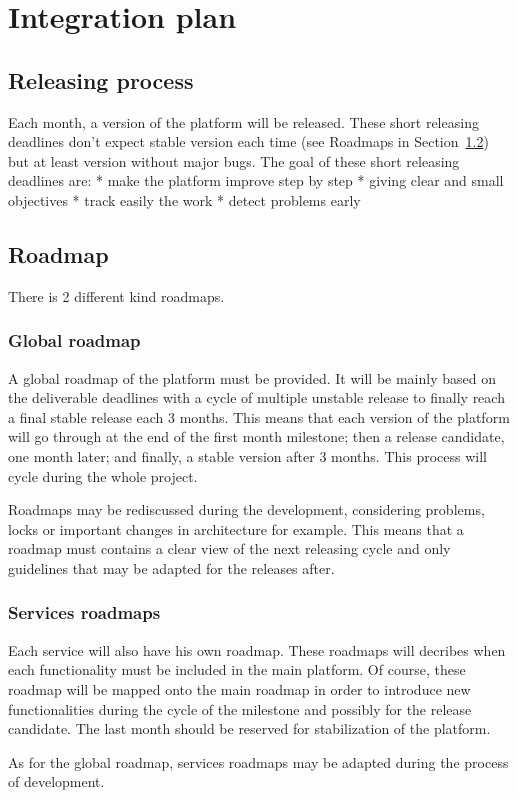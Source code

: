 \chapter{Integration plan}
\label{ch:integration-plan}

\section{Releasing process}
\label{sec:releasing-process}

Each month, a version of the platform will be released.
These short releasing deadlines don't expect stable version each time (see Roadmaps in Section~\ref{sec:roadmap}) but at least version without major bugs.
The goal of these short releasing deadlines are:
* make the platform improve step by step
* giving clear and small objectives
* track easily the work
* detect problems early

\section{Roadmap}
\label{sec:roadmap}

There is 2 different kind roadmaps.
\subsection{Global roadmap}
\label{sec:global-roadmap}

A global roadmap of the platform must be provided.
It will be mainly based on the deliverable deadlines with a cycle of multiple unstable release to finally reach a final stable release each 3 months.
This means that each version of the \learnpad platform will go through at the end of the first month milestone; then a release candidate, one month later; and finally, a stable version after 3 months.
This process will cycle during the whole project.

Roadmaps may be rediscussed during the development, considering problems, locks or important changes in architecture for example.
This means that a roadmap must contains a clear view of the next releasing cycle and only guidelines that may be adapted for the releases after.

\subsection{Services roadmaps}
\label{sec:services-roadmaps}

Each service will also have his own roadmap.
These roadmaps will decribes when each functionality must be included in the main \learnpad platform.
Of course, these roadmap will be mapped onto the main roadmap in order to introduce new functionalities during the cycle of the milestone and possibly for the release candidate.
The last month should be reserved for stabilization of the platform.

As for the global roadmap, services roadmaps may be adapted during the process of development.
